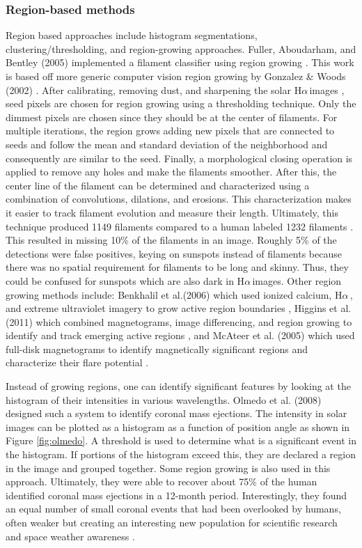 \documentclass[twoside]{report}
\newcommand{\halpha}{H$\alpha$\,}
\begin{document}
\subsubsection{Region-based methods}
Region based approaches include histogram segmentations, clustering/thresholding, and region-growing approaches. Fuller, Aboudarham, and Bentley (2005) implemented a filament classifier using region growing \cite{fuller:2005}. This work is based off more generic computer vision region growing by Gonzalez \& Woods (2002) \cite{gonzalez:2002}. After calibrating, removing dust, and sharpening the solar \halpha images \cite{standardization}, seed pixels are chosen for region growing using a thresholding technique. Only the dimmest pixels are chosen since they should be at the center of filaments. For multiple iterations, the region grows adding new pixels that are connected to seeds and follow the mean and standard deviation of the neighborhood and consequently are similar to the seed. Finally, a morphological closing operation is applied to remove any holes and make the filaments smoother. After this, the center line of the filament can be determined and characterized using a combination of convolutions, dilations, and erosions. This characterization makes it easier to track filament evolution and measure their length. Ultimately, this technique produced 1149 filaments compared to a human labeled 1232 filaments \cite{fuller:2005}. This resulted in missing 10\% of the filaments in an image. Roughly 5\% of the detections were false positives, keying on sunspots instead of filaments because there was no spatial requirement for filaments to be long and skinny. Thus, they could be confused for sunspots which are also dark in \halpha images. Other region growing methods include: Benkhalil et al.(2006) which used ionized calcium, \halpha, and extreme ultraviolet imagery to grow active region boundaries \cite{benkhalil}, Higgins et al. (2011) which combined magnetograms, image differencing, and region growing to identify and track emerging active regions \cite{higgins}, and McAteer et al. (2005) which used full-disk magnetograms to identify magnetically significant regions and characterize their flare potential \cite{mcateer}. 

Instead of growing regions, one can identify significant features by looking at the histogram of their intensities in various wavelengths. Olmedo et al. (2008) designed such a system to identify coronal mass ejections. The intensity in solar images can be plotted as a histogram as a function of position angle as shown in Figure \ref{fig:olmedo}. A threshold is used to determine what is a significant event in the histogram. If portions of the histogram exceed this, they are declared a region in the image and grouped together. Some region growing is also used in this approach. Ultimately, they were able to recover about 75\% of the human identified coronal mass ejections in a 12-month period. Interestingly, they found an equal number of small coronal events that had been overlooked by humans, often weaker but creating an interesting new population for scientific research and space weather awareness \cite{olmedo2008automatic}. 
\end{document}
